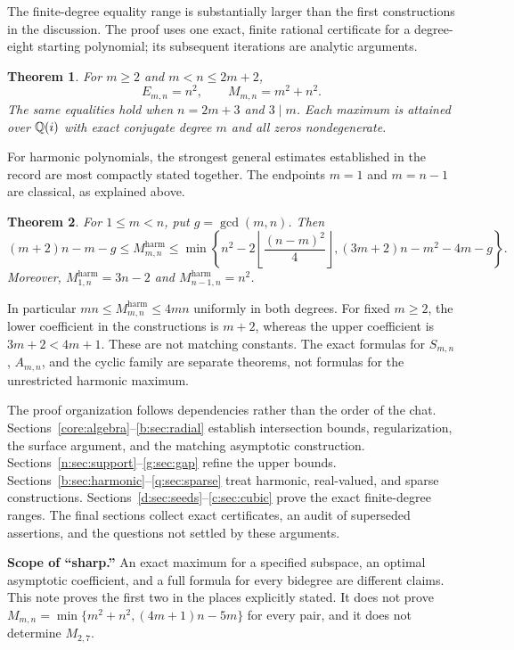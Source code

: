 \documentclass[UTF8,11pt]{ctexart}
\newtheorem{thm}{Theorem}[section]
\theoremstyle{definition}
\numberwithin{equation}{section}
\begin{document}
The finite-degree equality range is substantially larger than the first constructions in the discussion. The proof uses one exact, finite rational certificate for a degree-eight starting polynomial; its subsequent iterations are analytic arguments.
\begin{thm}\label{d:thm:main}
For $m\ge2$ and $m<n\le2m+2$,
\begin{equation}\label{d:eq:main}
 E_{m,n}=n^2,\qquad M_{m,n}=m^2+n^2.
\end{equation}
The same equalities hold when $n=2m+3$ and $3\mid m$. Each maximum is attained over $\mathbb Q(i)$ with exact conjugate degree $m$ and all zeros nondegenerate.
\end{thm}

For harmonic polynomials, the strongest general estimates established in the record are most compactly stated together. The endpoints $m=1$ and $m=n-1$ are classical, as explained above.
\begin{thm}\label{core:harmonicbounds}
For $1\le m<n$, put $g=\gcd(m,n)$. Then
\begin{equation}\label{core:harmonicbounds:eq}
 (m+2)n-m-g\le M^{\mathrm{harm}}_{m,n}
 \le\min\left\{n^2-2\left\lfloor\frac{(n-m)^2}{4}\right\rfloor,
 (3m+2)n-m^2-4m-g\right\}.
\end{equation}
Moreover, $M^{\mathrm{harm}}_{1,n}=3n-2$ and $M^{\mathrm{harm}}_{n-1,n}=n^2$.
\end{thm}

In particular $mn\le M^{\mathrm{harm}}_{m,n}\le4mn$ uniformly in both degrees. For fixed $m\ge2$, the lower coefficient in the constructions is $m+2$, whereas the upper coefficient is $3m+2<4m+1$. These are not matching constants. The exact formulas for $S_{m,n}$, $A_{m,n}$, and the cyclic family are separate theorems, not formulas for the unrestricted harmonic maximum.

The proof organization follows dependencies rather than the order of the chat. Sections~\ref{core:algebra}--\ref{b:sec:radial} establish intersection bounds, regularization, the surface argument, and the matching asymptotic construction. Sections~\ref{n:sec:support}--\ref{g:sec:gap} refine the upper bounds. Sections~\ref{b:sec:harmonic}--\ref{q:sec:sparse} treat harmonic, real-valued, and sparse constructions. Sections~\ref{d:sec:seeds}--\ref{c:sec:cubic} prove the exact finite-degree ranges. The final sections collect exact certificates, an audit of superseded assertions, and the questions not settled by these arguments.

\begin{tcolorbox}[colback=MidnightBlue!4,colframe=MidnightBlue!50,sharp corners,boxrule=.5pt]
\textbf{Scope of ``sharp.''} An exact maximum for a specified subspace, an optimal asymptotic coefficient, and a full formula for every bidegree are different claims. This note proves the first two in the places explicitly stated. It does not prove $M_{m,n}=\min\{m^2+n^2,(4m+1)n-5m\}$ for every pair, and it does not determine $M_{2,7}$.
\end{tcolorbox}
\end{document}
